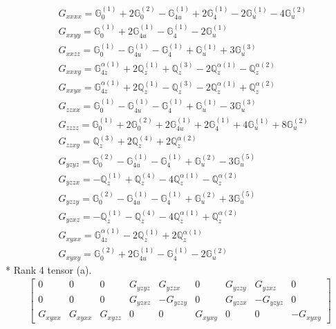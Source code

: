 \documentclass[fleqn,8pt,landscape]{jsarticle}
\begin{document}
\begin{align*}
& G_{xxxx} = \mathbb{G}_{0}^{(1)} + 2 \mathbb{G}_{0}^{(2)} - \mathbb{G}_{4u}^{(1)} + 2 \mathbb{G}_{4}^{(1)} - 2 \mathbb{G}_{u}^{(1)} - 4 \mathbb{G}_{u}^{(2)} \\
& G_{xxyy} = \mathbb{G}_{0}^{(1)} + 2 \mathbb{G}_{4u}^{(1)} - \mathbb{G}_{4}^{(1)} - 2 \mathbb{G}_{u}^{(1)} \\
& G_{xxzz} = \mathbb{G}_{0}^{(1)} - \mathbb{G}_{4u}^{(1)} - \mathbb{G}_{4}^{(1)} + \mathbb{G}_{u}^{(1)} + 3 \mathbb{G}_{u}^{(3)} \\
& G_{xxxy} = \mathbb{G}_{4z}^{\alpha(1)} + 2 \mathbb{Q}_{z}^{(1)} + \mathbb{Q}_{z}^{(3)} - 2 \mathbb{Q}_{z}^{\alpha(1)} - \mathbb{Q}_{z}^{\alpha(2)} \\
& G_{xxyx} = \mathbb{G}_{4z}^{\alpha(1)} + 2 \mathbb{Q}_{z}^{(1)} - \mathbb{Q}_{z}^{(3)} - 2 \mathbb{Q}_{z}^{\alpha(1)} + \mathbb{Q}_{z}^{\alpha(2)} \\
& G_{zzxx} = \mathbb{G}_{0}^{(1)} - \mathbb{G}_{4u}^{(1)} - \mathbb{G}_{4}^{(1)} + \mathbb{G}_{u}^{(1)} - 3 \mathbb{G}_{u}^{(3)} \\
& G_{zzzz} = \mathbb{G}_{0}^{(1)} + 2 \mathbb{G}_{0}^{(2)} + 2 \mathbb{G}_{4u}^{(1)} + 2 \mathbb{G}_{4}^{(1)} + 4 \mathbb{G}_{u}^{(1)} + 8 \mathbb{G}_{u}^{(2)} \\
& G_{zzxy} = \mathbb{Q}_{z}^{(3)} + 2 \mathbb{Q}_{z}^{(4)} + 2 \mathbb{Q}_{z}^{\alpha(2)} \\
& G_{yzyz} = \mathbb{G}_{0}^{(2)} - \mathbb{G}_{4u}^{(1)} - \mathbb{G}_{4}^{(1)} + \mathbb{G}_{u}^{(2)} - 3 \mathbb{G}_{u}^{(5)} \\
& G_{yzzx} = - \mathbb{Q}_{z}^{(1)} + \mathbb{Q}_{z}^{(4)} - 4 \mathbb{Q}_{z}^{\alpha(1)} - \mathbb{Q}_{z}^{\alpha(2)} \\
& G_{yzzy} = \mathbb{G}_{0}^{(2)} - \mathbb{G}_{4u}^{(1)} - \mathbb{G}_{4}^{(1)} + \mathbb{G}_{u}^{(2)} + 3 \mathbb{G}_{u}^{(5)} \\
& G_{yzxz} = - \mathbb{Q}_{z}^{(1)} - \mathbb{Q}_{z}^{(4)} - 4 \mathbb{Q}_{z}^{\alpha(1)} + \mathbb{Q}_{z}^{\alpha(2)} \\
& G_{xyxx} = \mathbb{G}_{4z}^{\alpha(1)} - 2 \mathbb{Q}_{z}^{(1)} + 2 \mathbb{Q}_{z}^{\alpha(1)} \\
& G_{xyxy} = \mathbb{G}_{0}^{(2)} + 2 \mathbb{G}_{4u}^{(1)} - \mathbb{G}_{4}^{(1)} - 2 \mathbb{G}_{u}^{(2)}
\end{align*}
* Rank 4 tensor (a).
\begin{align*}
\begin{bmatrix} 0 & 0 & 0 & G_{yzyz} & G_{yzzx} & 0 & G_{yzzy} & G_{yzxz} & 0 \\ 0 & 0 & 0 & G_{yzxz} & - G_{yzzy} & 0 & G_{yzzx} & - G_{yzyz} & 0 \\ G_{xyxx} & G_{xyxx} & G_{xyzz} & 0 & 0 & G_{xyxy} & 0 & 0 & - G_{xyxy} \end{bmatrix}
\end{align*}
\end{document}
